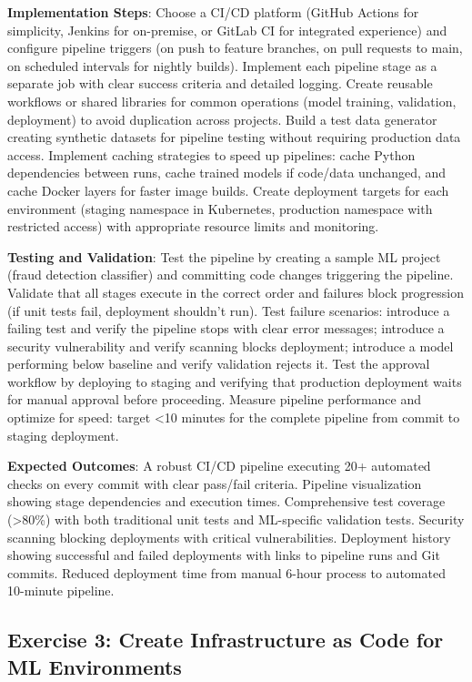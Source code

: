 \textbf{Implementation Steps}: Choose a CI/CD platform (GitHub Actions for simplicity, Jenkins for on-premise, or GitLab CI for integrated experience) and configure pipeline triggers (on push to feature branches, on pull requests to main, on scheduled intervals for nightly builds). Implement each pipeline stage as a separate job with clear success criteria and detailed logging. Create reusable workflows or shared libraries for common operations (model training, validation, deployment) to avoid duplication across projects. Build a test data generator creating synthetic datasets for pipeline testing without requiring production data access. Implement caching strategies to speed up pipelines: cache Python dependencies between runs, cache trained models if code/data unchanged, and cache Docker layers for faster image builds. Create deployment targets for each environment (staging namespace in Kubernetes, production namespace with restricted access) with appropriate resource limits and monitoring.

\textbf{Testing and Validation}: Test the pipeline by creating a sample ML project (fraud detection classifier) and committing code changes triggering the pipeline. Validate that all stages execute in the correct order and failures block progression (if unit tests fail, deployment shouldn't run). Test failure scenarios: introduce a failing test and verify the pipeline stops with clear error messages; introduce a security vulnerability and verify scanning blocks deployment; introduce a model performing below baseline and verify validation rejects it. Test the approval workflow by deploying to staging and verifying that production deployment waits for manual approval before proceeding. Measure pipeline performance and optimize for speed: target <10 minutes for the complete pipeline from commit to staging deployment.

\textbf{Expected Outcomes}: A robust CI/CD pipeline executing 20+ automated checks on every commit with clear pass/fail criteria. Pipeline visualization showing stage dependencies and execution times. Comprehensive test coverage (>80\%) with both traditional unit tests and ML-specific validation tests. Security scanning blocking deployments with critical vulnerabilities. Deployment history showing successful and failed deployments with links to pipeline runs and Git commits. Reduced deployment time from manual 6-hour process to automated 10-minute pipeline.

\subsection{Exercise 3: Create Infrastructure as Code for ML Environments}

